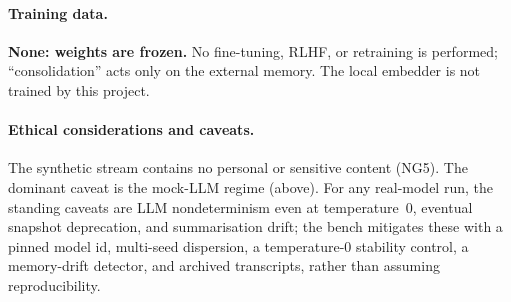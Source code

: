 \paragraph{Training data.} \textbf{None: weights are frozen.} No fine-tuning,
RLHF, or retraining is performed; ``consolidation'' acts only on the external
memory. The local embedder is not trained by this project.

\paragraph{Ethical considerations and caveats.} The synthetic stream contains no
personal or sensitive content (NG5). The dominant caveat is the mock-LLM regime
(above). For any real-model run, the standing caveats are LLM nondeterminism even
at temperature~0, eventual snapshot deprecation, and summarisation drift; the
bench mitigates these with a pinned model id, multi-seed dispersion, a
temperature-0 stability control, a memory-drift detector, and archived
transcripts, rather than assuming reproducibility.

